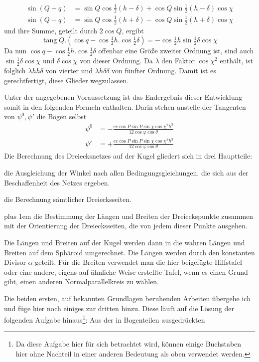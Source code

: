 %
\[
\begin{aligned}
\sin(Q+q)&=\sin Q\cos\tfrac{1}{2}(h-\delta)+\cos Q\sin\tfrac{1}{2}(h-\delta)\cos\chi\\
\sin(Q-q)&=\sin Q\cos\tfrac{1}{2}(h+\delta)-\cos Q\sin\tfrac{1}{2}(h+\delta)\cos\chi
\end{aligned}
\]
und ihre Summe, geteilt durch \(2\cos Q\), ergibt
\[
\operatorname{tang}Q\mathord{.}(\cos q-\cos\tfrac{1}{2}h\mathord{.}\cos\tfrac{1}{2}\delta)=-\cos\tfrac{1}{2}h\sin\tfrac{1}{2}\delta\cos\chi
\]
\indent Da nun \(\cos q-\cos\tfrac{1}{2}h\mathord{.}\cos\tfrac{1}{2}\delta\) offenbar eine Größe zweiter Ordnung ist, sind auch \(\sin\tfrac{1}{2}\delta\cos\chi\) und \(\delta\cos\chi\) von dieser Ordnung. Da \(\lambda\) den Faktor \(\cos\chi^2\) enthält, ist folglich \(\lambda hh\delta\) von vierter und \(\lambda h\delta\delta\) von fünfter Ordnung. Damit ist es gerechtfertigt, diese Glieder wegzulassen.

Unter der angegebenen Voraussetzung ist das Endergebnis dieser Entwicklung somit in den folgenden Formeln enthalten. Darin stehen anstelle der Tangenten von \(\psi^0,\psi'\) die Bögen selbst
\[
\begin{aligned}
\psi^0&=-\frac{ee\cos P\sin P\sin\chi\cos\chi^2h^3}{12\cos\varphi\cos\theta}\\
\psi'&=+\frac{ee\cos P\sin P\sin\chi\cos\chi^2h^3}{12\cos\varphi\cos\theta}
\end{aligned}
\]
Die Berechnung des Dreiecksnetzes auf der Kugel gliedert sich in drei Hauptteile:
\begin{list}{}{\setlength{\leftmargin}{1.8em}\setlength{\labelwidth}{1.4em}\setlength{\labelsep}{.4em}\setlength{\itemsep}{0pt}}
\item[1)] die Ausgleichung der Winkel nach allen Bedingungsgleichungen, die sich aus der Beschaffenheit des Netzes ergeben.
\item[2)] die Berechnung sämtlicher Dreiecksseiten.
\item[3)] \begingroup\rightskip=0pt plus 1em
die Bestimmung der Längen und Breiten der Dreieckspunkte zusammen mit der Orientierung der Dreiecksseiten, die von jedem dieser Punkte ausgehen.\par\endgroup
\end{list}
\hspace*{\parindent}Die Längen und Breiten auf der Kugel werden dann in die wahren Längen und Breiten auf dem Sphäroid umgerechnet. Die Längen werden durch den konstanten Divisor \(\alpha\) geteilt. Für die Breiten verwendet man die hier beigefügte Hilfstafel oder eine andere, eigens auf ähnliche Weise erstellte Tafel, wenn es einen Grund gibt, einen anderen Normalparallelkreis zu wählen.

Die beiden ersten, auf bekannten Grundlagen beruhenden Arbeiten übergehe ich und füge hier noch einiges zur dritten hinzu. Diese läuft auf die Lösung der folgenden Aufgabe hinaus\footnote{Da diese Aufgabe hier für sich betrachtet wird, können einige Buchstaben hier ohne Nachteil in einer anderen Bedeutung als oben verwendet werden.}: Aus der in Bogenteilen ausgedrückten

